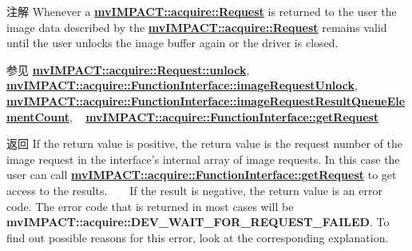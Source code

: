 \begin{DoxyNote}{注解}
Whenever a {\bfseries \hyperlink{classmv_i_m_p_a_c_t_1_1acquire_1_1_request}{mv\+I\+M\+P\+A\+C\+T\+::acquire\+::\+Request}} is returned to the user the image data described by the {\bfseries \hyperlink{classmv_i_m_p_a_c_t_1_1acquire_1_1_request}{mv\+I\+M\+P\+A\+C\+T\+::acquire\+::\+Request}} remains valid until the user unlocks the image buffer again or the driver is closed.
\end{DoxyNote}
\begin{DoxySeeAlso}{参见}
{\bfseries \hyperlink{classmv_i_m_p_a_c_t_1_1acquire_1_1_request_a3c30ced407d20caef49e3148257cd91e}{mv\+I\+M\+P\+A\+C\+T\+::acquire\+::\+Request\+::unlock}}, ~\newline
{\bfseries \hyperlink{classmv_i_m_p_a_c_t_1_1acquire_1_1_function_interface_a378a338217d5a681e880a0d9395f1a62}{mv\+I\+M\+P\+A\+C\+T\+::acquire\+::\+Function\+Interface\+::image\+Request\+Unlock}}, ~\newline
{\bfseries \hyperlink{classmv_i_m_p_a_c_t_1_1acquire_1_1_function_interface_a7e608625f2db03327c3fe9964967d0bc}{mv\+I\+M\+P\+A\+C\+T\+::acquire\+::\+Function\+Interface\+::image\+Request\+Result\+Queue\+Element\+Count}}, ~\newline
{\bfseries \hyperlink{classmv_i_m_p_a_c_t_1_1acquire_1_1_function_interface_afea62dee2bda1b47c24821f9121c5505}{mv\+I\+M\+P\+A\+C\+T\+::acquire\+::\+Function\+Interface\+::get\+Request}} 
\end{DoxySeeAlso}
\begin{DoxyReturn}{返回}
If the return value is positive, the return value is the request number of the image request in the interface's internal array of image requests. In this case the user can call {\bfseries \hyperlink{classmv_i_m_p_a_c_t_1_1acquire_1_1_function_interface_afea62dee2bda1b47c24821f9121c5505}{mv\+I\+M\+P\+A\+C\+T\+::acquire\+::\+Function\+Interface\+::get\+Request}} to get access to the results. ~\newline
 ~\newline
 If the result is negative, the return value is an error code. The error code that is returned in most cases will be {\bfseries mv\+I\+M\+P\+A\+C\+T\+::acquire\+::\+D\+E\+V\+\_\+\+W\+A\+I\+T\+\_\+\+F\+O\+R\+\_\+\+R\+E\+Q\+U\+E\+S\+T\+\_\+\+F\+A\+I\+L\+E\+D}. To find out possible reasons for this error, look at the corresponding explanation. 
\end{DoxyReturn}

